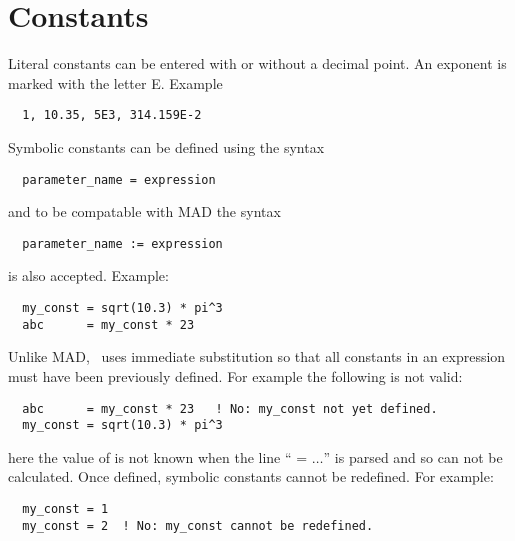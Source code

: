 \section{Constants}

Literal constants can be entered with or without a decimal point. An
exponent is marked with the letter E. Example
\begin{verbatim}
  1, 10.35, 5E3, 314.159E-2
\end{verbatim}

Symbolic constants can be defined using the syntax
\begin{verbatim}
  parameter_name = expression
\end{verbatim}
and to be compatable with MAD the syntax
\begin{verbatim}
  parameter_name := expression
\end{verbatim}
is also accepted. Example:
\begin{verbatim}
  my_const = sqrt(10.3) * pi^3
  abc      = my_const * 23
\end{verbatim}
Unlike MAD, \bmad\ uses immediate substitution so that all constants
in an expression must have been previously defined. For example the
following is not valid:
\begin{verbatim}
  abc      = my_const * 23   ! No: my_const not yet defined.
  my_const = sqrt(10.3) * pi^3
\end{verbatim}
here the value of  is not known when the line ``
= $\ldots$'' is parsed and so  can not be calculated. Once
defined, symbolic constants cannot be redefined. For example:
\begin{verbatim}
  my_const = 1
  my_const = 2  ! No: my_const cannot be redefined.
\end{verbatim}
